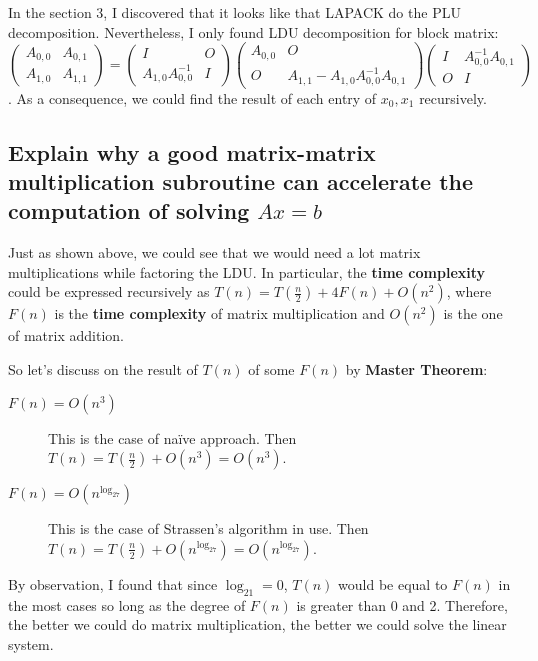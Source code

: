 \documentclass[12pt, a4paper]{article}
\begin{document}
In the section 3, I discovered that it looks like that \textsf{LAPACK} do the  \textsf{PLU decomposition}. Nevertheless, I only found \textsf{LDU decomposition} for block matrix: $$\begin{pmatrix}A_{0,0}&A_{0,1}\\A_{1,0}&A_{1,1}\end{pmatrix}=\begin{pmatrix}I&O\\A_{1,0}A_{0,0}^{-1}&I\end{pmatrix}\begin{pmatrix}A_{0,0}&O\\O&A_{1,1}-A_{1,0}A_{0,0}^{-1}A_{0,1}\end{pmatrix}\begin{pmatrix}I&A_{0,0}^{-1}A_{0,1}\\O&I\end{pmatrix}$$. As a consequence, we could find the result of each entry of $x_0,x_1$ recursively.

\subsection{Explain why a good matrix-matrix multiplication subroutine can accelerate the computation of solving $Ax = b$}

Just as shown above, we could see that we would need a lot matrix multiplications while factoring the \textsf{LDU}. In particular, the \textbf{time complexity} could be expressed recursively as $T(n)=T(\frac{n}{2})+4F(n)+O(n^2)$, where $F(n)$ is the \textbf{time complexity} of matrix multiplication and $O(n^2)$ is the one of matrix addition.

So let's discuss on the result of $T(n)$ of some $F(n)$ by \textbf{Master Theorem}\footnotemark:

\begin{description}
\item[$F(n)=O(n^3)$] This is the case of na\"{i}ve approach. Then $T(n)=T(\frac{n}{2})+O(n^3)=O(n^3)$.
\item[$F(n)=O(n^{\log_27})$] This is the case of Strassen's algorithm in use. Then $T(n)=T(\frac{n}{2})+O(n^{\log_27})=O(n^{\log_27})$.
\end{description}

By observation, I found that since $\log_21=0$, $T(n)$ would be equal to $F(n)$ in the most cases so long as the degree of $F(n)$ is greater than 0 and 2. Therefore, the better we could do matrix multiplication, the better we could solve the linear system.
\end{document}
